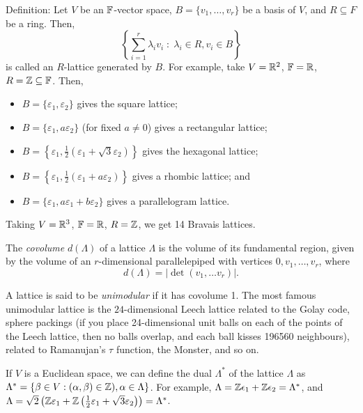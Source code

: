 Definition: Let $V$ be an $\mathbb{F}$-vector space, $B = \{v_1, \dots, v_r\}$ be a
basis of $V$, and $R \subseteq F$ be a ring. Then,
\[
    \left\{ \sum_{i=1}^{r} \lambda_i v_i \; : \; \lambda_i \in R, v_i \in B\right\}
\]
is called an $R$-lattice generated by $B$.
For example, take $V = \mathbb{R}^2$, $\mathbb{F} = \mathbb{R}$, $R = \mathbb{Z} \subseteq \mathbb{F}$. Then,
\begin{itemize}
\item
$B = \{\varepsilon_1, \varepsilon_2\}$ gives the square lattice;
\item
$B = \{\varepsilon_1, a\varepsilon_2\}$ (for fixed $a \neq 0$) gives a
rectangular lattice;
\item
$B = \left\{\varepsilon_1, \frac{1}{2}(\varepsilon_1 + \sqrt{3} \varepsilon_2)\right\}$
gives the hexagonal lattice;
\item
$B = \left\{\varepsilon_1, \frac{1}{2} (\varepsilon_1 + a\varepsilon_2) \right\}$
gives a rhombic lattice; and
\item
$B = \{\varepsilon_1, a\varepsilon_1 + b\varepsilon_2\}$
gives a parallelogram lattice.
\end{itemize}
Taking $V = \mathbb{R}^3$, $\mathbb{F} = \mathbb{R}$, $R = \mathbb{Z}$, we get 14 Bravais lattices.

The {\em covolume} $d(\Lambda)$ of a lattice $\Lambda$ is the volume of its
fundamental region, given by the volume of an $r$-dimensional parallelepiped
with vertices $0, v_1, \dots, v_r$, where
\[
    d(\Lambda) = |\det (v_1, \dots v_r)|.
\]

A lattice is said to be {\em unimodular} if it has covolume 1. The most famous
unimodular lattice is the $24$-dimensional Leech lattice related to the Golay
code, sphere packings (if you place 24-dimensional unit balls on each of the
points of the Leech lattice, then no balls overlap, and each ball kisses
196560 neighbours), related to Ramanujan's $\tau$ function, the Monster, and
so on.

If $V$ is a Euclidean space, we can define the dual $\Lambda^*$ of the lattice
$\Lambda$ as $\Lambda^* = \{\beta \in V : (\alpha, \beta) \in \mathbb{Z}),
\alpha \in \Lambda\}$.
For example, $\Lambda = \mathbb{Z}\epsilon_1 + \mathbb{Z}\epsilon_2 = \Lambda^*$, and
$\Lambda = \sqrt{2} \left( \mathbb{Z} \varepsilon_1 + \mathbb{Z} \left(
\frac{1}{2} \varepsilon_1 + \sqrt{3} \varepsilon_2\right) \right) = \Lambda^*$.
